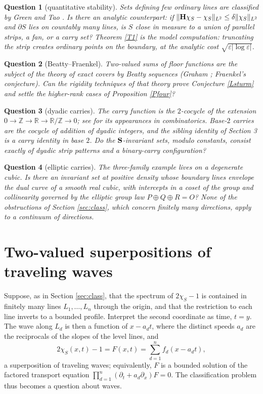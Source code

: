\documentclass{article}
\newtheorem{question}{Question}
\def\H{{\bf H}}
\def\S{{\bf S}}
\def\R{{\mathbb R}}
\def\Z{{\mathbb Z}}
\begin{document}
	\begin{question}[quantitative stability]
		Sets defining few ordinary lines are classified by Green and Tao \cite{GT}. Is there an analytic counterpart: if $\|\H\chi_S-\chi_S\|_{L^2}\leq\delta\|\chi_S\|_{L^2}$ and $\partial S$ lies on countably many lines, is $S$ close in measure to a union of parallel strips, a fan, or a carry set? Theorem \ref{T1} is the model computation: truncating the strip creates ordinary points on the boundary, at the analytic cost $\sqrt{\varepsilon|\log\varepsilon|}$.
	\end{question}

	\begin{question}[Beatty--Fraenkel]
		Two-valued sums of floor functions are the subject of the theory of exact covers by Beatty sequences (Graham \cite{Gr}; Fraenkel's conjecture). Can the rigidity techniques of that theory prove Conjecture \ref{Lsturm} and settle the higher-rank cases of Proposition \ref{Pfour}?
	\end{question}

	\begin{question}[dyadic carries]
		The carry function is the $2$-cocycle of the extension $0\to\Z\to\R\to\R/\Z\to 0$; see \cite{DF} for its appearances in combinatorics. Base-$2$ carries are the cocycle of addition of dyadic integers, and the sibling identity of Section 3 is a carry identity in base $2$. Do the $\S$-invariant sets, modulo constants, consist exactly of dyadic strip patterns and a binary-carry configuration?
	\end{question}

	\begin{question}[elliptic carries]\label{Qell}
		The three-family example lives on a degenerate cubic. Is there an invariant set at positive density whose boundary lines envelope the dual curve of a smooth real cubic, with intercepts in a coset of the group and collinearity governed by the elliptic group law $P\oplus Q\oplus R=O$? None of the obstructions of Section \ref{sec:class}, which concern finitely many directions, apply to a continuum of directions.
	\end{question}

	\section{Two-valued superpositions of traveling waves}\label{sec:waves}

	Suppose, as in Section \ref{sec:class}, that the spectrum of $2\chi_S-1$ is contained in finitely many lines $L_1,\dots,L_n$ through the origin, and that the restriction to each line inverts to a bounded profile. Interpret the second coordinate as time, $t=y$. The wave along $L_d$ is then a function of $x-a_dt$, where the distinct speeds $a_d$ are the reciprocals of the slopes of the level lines, and
	\begin{equation}\label{wavesum}
		2\chi_S(x,t)-1=F(x,t)=\sum_{d=1}^{n}f_d(x-a_dt),
	\end{equation}
	a superposition of traveling waves; equivalently, $F$ is a bounded solution of the factored transport equation $\prod_{d=1}^n(\partial_t+a_d\partial_x)F=0$. The classification problem thus becomes a question about waves.
\end{document}
